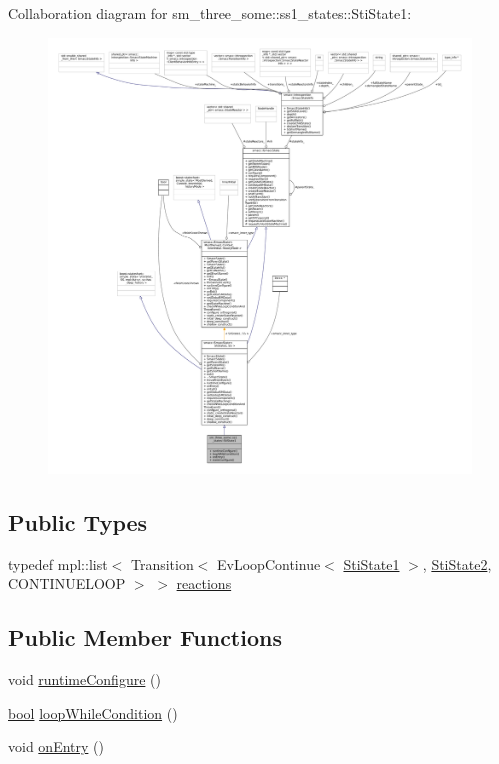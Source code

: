 Collaboration diagram for sm\+\_\+three\+\_\+some\+:\+:ss1\+\_\+states\+:\+:Sti\+State1\+:
\nopagebreak
\begin{figure}[H]
\begin{center}
\leavevmode
\includegraphics[width=350pt]{structsm__three__some_1_1ss1__states_1_1StiState1__coll__graph}
\end{center}
\end{figure}
\subsection*{Public Types}
\begin{DoxyCompactItemize}
\item 
typedef mpl\+::list$<$ Transition$<$ Ev\+Loop\+Continue$<$ \hyperlink{structsm__three__some_1_1ss1__states_1_1StiState1}{Sti\+State1} $>$, \hyperlink{structsm__three__some_1_1ss1__states_1_1StiState2}{Sti\+State2}, C\+O\+N\+T\+I\+N\+U\+E\+L\+O\+OP $>$ $>$ \hyperlink{structsm__three__some_1_1ss1__states_1_1StiState1_add54306b7f1b76be74f9dd9d8a238523}{reactions}
\end{DoxyCompactItemize}
\subsection*{Public Member Functions}
\begin{DoxyCompactItemize}
\item 
void \hyperlink{structsm__three__some_1_1ss1__states_1_1StiState1_a0037c4751ef43faee050f967c2ac1188}{runtime\+Configure} ()
\item 
\hyperlink{classbool}{bool} \hyperlink{structsm__three__some_1_1ss1__states_1_1StiState1_a815626146e4b45d386ca4b529e330541}{loop\+While\+Condition} ()
\item 
void \hyperlink{structsm__three__some_1_1ss1__states_1_1StiState1_a1d66f8c091e275ffba7f45f5a83872fb}{on\+Entry} ()
\end{DoxyCompactItemize}
